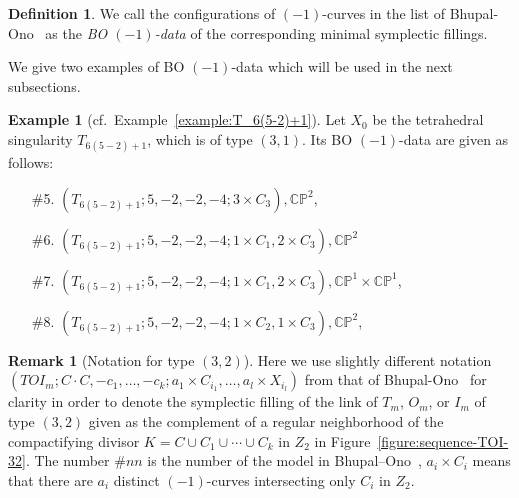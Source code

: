 \documentclass[reqno, twoside, a4paper]{amsart}
\theoremstyle{definition}
\newtheorem{definition}[theorem]{Definition}
\newtheorem{remark}[theorem]{Remark}
\newtheorem{example}[theorem]{Example}
\numberwithin{equation}{section}
\begin{document}
\begin{definition}
We call the configurations of $(-1)$-curves in the list of Bhupal-Ono~\cite[Section~5]{Bhupal-Ono-2012} as the \emph{BO $(-1)$-data} of the corresponding minimal symplectic fillings.
\end{definition}

We give two examples of BO $(-1)$-data which will be used in the next subsections.

\begin{example}[cf.~Example~\ref{example:T_6(5-2)+1}]
\label{example:BO-(-1)-data-T_6(5-2)+1}
Let $X_0$ be the tetrahedral singularity $T_{6(5-2)+1}$, which is of type $(3,1)$. Its BO $(-1)$-data are given as follows:

\begin{enumerate}
\item[\#5.] $(T_{6(5-2)+1}; 5,-2,-2,-4; 3 \times C_3), \mathbb{CP}^2$,
\item[\#6.] $(T_{6(5-2)+1}; 5,-2,-2,-4; 1 \times C_1, 2 \times C_3), \mathbb{CP}^2$
\item[\#7.] $(T_{6(5-2)+1}; 5,-2,-2,-4; 1 \times C_1, 2 \times C_3), \mathbb{CP}^1 \times \mathbb{CP}^1$,
\item[\#8.] $(T_{6(5-2)+1}; 5,-2,-2,-4; 1 \times C_2, 1 \times C_3),\mathbb{CP}^2$,
\end{enumerate}
\end{example}

\begin{remark}[Notation for type $(3,2)$]
Here we use slightly different notation $(TOI_m; C \cdot C, -c_1, \dotsc ,-c_k; a_1 \times C_{i_1}, \dotsc , a_l \times X_{i_l})$ from that of Bhupal-Ono~\cite{Bhupal-Ono-2012} for clarity in order to denote the symplectic filling of the link of $T_m$, $O_m$, or $I_m$ of type $(3,2)$ given as the complement of a regular neighborhood of the compactifying divisor $K = C \cup  C_1 \cup \dotsb \cup C_k$ in $Z_2$ in Figure~\ref{figure:sequence-TOI-32}. The number $\# nn$ is the number of the model in Bhupal--Ono~\cite{Bhupal-Ono-2012}, $a_i \times C_i$ means that there are $a_i$ distinct $(-1)$-curves intersecting only $C_i$ in $Z_2$.
\end{remark}
\end{document}
